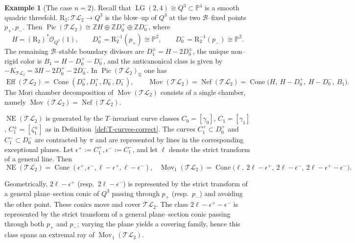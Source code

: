 \documentclass[10pt]{amsart}
\theoremstyle{definition}
\newtheorem{example}[theorem]{Example}
\newcommand{\OO}{\mathcal{O}}
\newcommand{\Pic}{\operatorname{Pic}}
\newcommand{\Eff}{\operatorname{Eff}}
\newcommand{\Nef}{\operatorname{Nef}}
\newcommand{\Mov}{\operatorname{Mov}}
\newcommand{\LG}{\operatorname{LG}}
\DeclareMathOperator{\NE}{NE}
\newcommand{\TL}{\mathcal{TL}}
\newcommand{\QQ}{\mathbb{Q}}
\newcommand{\ZZ}{\mathbb{Z}}
\newcommand{\PP}{\mathbb{P}}
\newcommand{\RL}{\mathrm{R}}
\newcommand{\cone}{\operatorname{Cone}}
\theoremstyle{plain} %
\begin{document}
\begin{example}[The case $n=2$]\label{subsec:TL2}
Recall that $\LG(2,4)\cong Q^3\subset \PP^4$ is a smooth quadric threefold.
$\RL_2\colon \TL_2\to Q^3$ is the blow--up of $Q^3$ at the two $\mathscr{B}$--fixed points
$p_+,p_-$. Then $\Pic(\TL_2)\cong \ZZ H\oplus \ZZ D_0^+\oplus \ZZ D_0^-$, where
\[
H=(\RL_2)^*\OO_{Q^3}(1),\qquad
D_0^+=\RL_2^{-1}(p_+)\cong \PP^2,\qquad
D_0^-=\RL_2^{-1}(p_-)\cong \PP^2.
\]
The remaining
$\mathscr{B}$--stable boundary divisors are
$D_1^{\pm}= H-2D_0^{\pm}$, the unique non--rigid color is $B_1=H-D_0^+-D_0^-$, and the anticanonical class is given by $-K_{\TL_2}= 3H-2D_0^+-2D_0^-$. In $\Pic(\TL_2)_\QQ$ one has
\[
\Eff(\TL_2)=\cone(D_0^+,D_1^+,D_0^-,D_1^-),\qquad
\Mov(\TL_2)=\Nef(\TL_2)=\cone\bigl(H,\ H-D_0^+,\ H-D_0^-,\ B_1\bigr).
\]
The Mori chamber decomposition of $\Mov(\TL_2)$ consists of a single
chamber, namely $\Mov(\TL_2)=\Nef(\TL_2)$.

$\NE(\TL_2)$ is generated by the $T$--invariant curve classes $C_0=[\gamma_0]$, $C_1=[\gamma_1]$, $C_1^{\pm}=[\zeta_1^\pm]$ as in Definition~\ref{def:T-curves-correct}. The curves $C_1^+\subset D_0^+$ and $C_1^-\subset D_0^-$ are contracted by $\pi$ and are represented by lines in the corresponding exceptional planes. Let $\epsilon^+ := C_1^+, \epsilon^- := C_1^-$, and let $\ell$ denote the strict transform of a general line. Then
\[
\NE(\TL_2)=\cone(\epsilon^+,\epsilon^-,\ell-\epsilon^+,\ell-\epsilon^-),
\,\,\,\,\,
\Mov_1(\TL_2)=\cone\bigl(\ell,\ 2\ell-\epsilon^+,\ 2\ell-\epsilon^-,\
2\ell-\epsilon^+-\epsilon^-\bigr).
\]

Geometrically, $2\ell-\epsilon^+$ (resp.\ $2\ell-\epsilon^-$) is represented by the
strict transform of a general plane--section conic of $Q^3$ passing
through $p_+$ (resp.\ $p_-$) and avoiding the other point. These conics move and
cover $\TL_2$. The class $2\ell-\epsilon^+-\epsilon^-$ is represented by the strict
transform of a general plane--section conic passing through both $p_+$ and $p_-$;
varying the plane yields a covering family, hence this class spans an extremal ray
of $\Mov_1(\TL_2)$.

\begin{figure}[ht]
\centering
\begin{subfigure}[b]{0.48\textwidth}
\centering
{}
\end{subfigure}
\end{figure}
\end{example}
\end{document}
